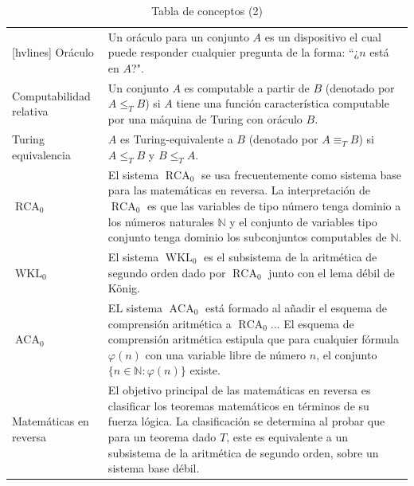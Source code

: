 \begin{table}[h]
    \centering
    \caption{Tabla de conceptos (2)}
    \label{tab: tabla_de_conceptos2}
    \begin{NiceTabular}{m{0.2\textwidth}m{0.7\textwidth}}[hvlines]
    Oráculo & Un oráculo para un conjunto $A$ es un dispositivo el cual puede responder cualquier pregunta de la forma: ``¿$n$ está en $A$?". \citep{Dzhafarov2023-km}\\
    Computabilidad relativa & Un conjunto $A$ es computable a partir de $B$ (denotado por $A\leq_{T} B$) si $A$ tiene una función característica computable por una máquina de Turing con oráculo $B$.\citep{Soare2018-wy}\\
    Turing equivalencia & $A$ es Turing-equivalente a $B$ (denotado por $A\equiv_{T} B$) si $A \leq_T B$ y $B \leq_T A$.\citep{Soare2018-wy}\\
    $\operatorname{RCA}_0$ &  El sistema $\operatorname{RCA}_{0}$ se usa frecuentemente como sistema base para las matemáticas en reversa. La interpretación de $\operatorname{RCA}_{0}$ es que las variables de tipo número tenga dominio a los números naturales $\mathbb{N}$ y el conjunto de variables tipo conjunto tenga dominio los subconjuntos computables de $\mathbb{N}$.\citep{Dzhafarov2023-km}\\
    $\operatorname{WKL}_{0}$ & El sistema $\operatorname{WKL}_{0}$ es el subsistema de la aritmética de segundo orden dado por $\operatorname{RCA}_{0}$ junto con el lema débil de K\"{o}nig. \citep{Dzhafarov2023-km}\\
    $\operatorname{ACA}_{0}$ & EL sistema $\operatorname{ACA}_{0}$ está formado al añadir el esquema de comprensión aritmética a $\operatorname{RCA}_{0}$... El esquema de comprensión aritmética estipula que para cualquier fórmula $\varphi(n)$ con una variable libre de número $n$, el conjunto $\{n\in\mathbb{N} : \varphi(n)\}$ existe.\citep{Dzhafarov2023-km}\\
    Matemáticas en reversa &  El objetivo principal de las matemáticas en reversa es clasificar los teoremas matemáticos en términos de su fuerza lógica. La clasificación se determina al probar que para un teorema dado $T$, este es equivalente a un subsistema de la aritmética de segundo orden, sobre un sistema base débil. \citep{Dzhafarov2023-km}
\end{NiceTabular}
\end{table}
